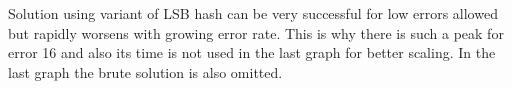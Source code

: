 Solution using variant of LSB hash can be very successful for low errors allowed but rapidly worsens with growing error rate. This is why there is such a peak for error 16 and also its time is not used in the last graph for better scaling. In the last graph the brute solution is also omitted.

\begin{figure}
\begin{minipage}{\linewidth}
\centering
{}
\end{minipage}\par\medskip

\begin{minipage}{.5\linewidth}
\centering
{}
\end{minipage}%
\begin{minipage}{.5\linewidth}
\centering
{}
\end{minipage}\par\medskip


\end{figure}
